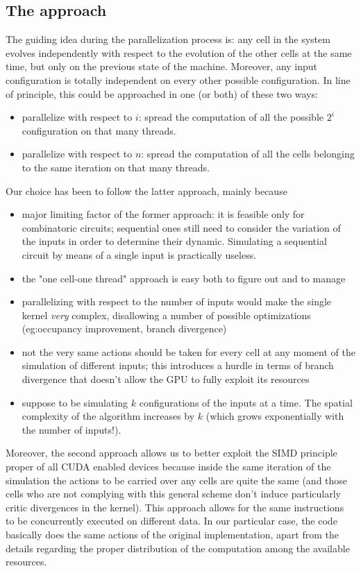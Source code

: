 \subsection{The approach}
The guiding idea during the parallelization process is: any cell in the system evolves independently with respect to the evolution of the other cells at the same time, but only on the previous state of the machine. Moreover, any input configuration is totally independent on every other possible configuration. In line of principle, this could be approached in one (or both) of these two ways:
\begin{itemize}
\item parallelize with respect to $i$: spread the computation of all the possible $2^i$ configuration on that many threads.
\item parallelize with respect to $n$: spread the computation of all the cells belonging to the same iteration on that many threads.
\end{itemize}
Our choice has been to follow the latter approach, mainly because 
\begin{itemize}
\item major limiting factor of the former approach: it is feasible only for combinatoric circuits; sequential ones still need to consider the variation of the inputs in order to determine their dynamic. Simulating a sequential circuit by means of a single input is practically useless.
\item the "one cell-one thread" approach is easy both to figure out and to manage
\item parallelizing with respect to the number of inputs would make the single kernel \textsl{very} complex, disallowing a number of possible optimizations (eg:occupancy improvement, branch divergence)  
\item not the very same actions should be taken for every cell at any moment of the simulation of different inputs; this introduces a hurdle in terms of branch divergence that doesn't allow the GPU to fully exploit its resources
\item suppose to be simulating $k$ configurations of the inputs at a time. The spatial complexity of the algorithm increases by $k$ (which grows exponentially with the number of inputs!).
\end{itemize} 

Moreover, the second approach allows us to better exploit the SIMD principle proper of all CUDA enabled devices because inside the same iteration of the simulation the actions to be carried over any cells are quite the same (and those cells who are not complying with this general scheme don't induce particularly critic divergences in the kernel). This approach allows for the same instructions to be concurrently executed on different data. In our particular case, the code basically does the same actions of the original implementation, apart from the details regarding the proper distribution of the computation among the available resources.

